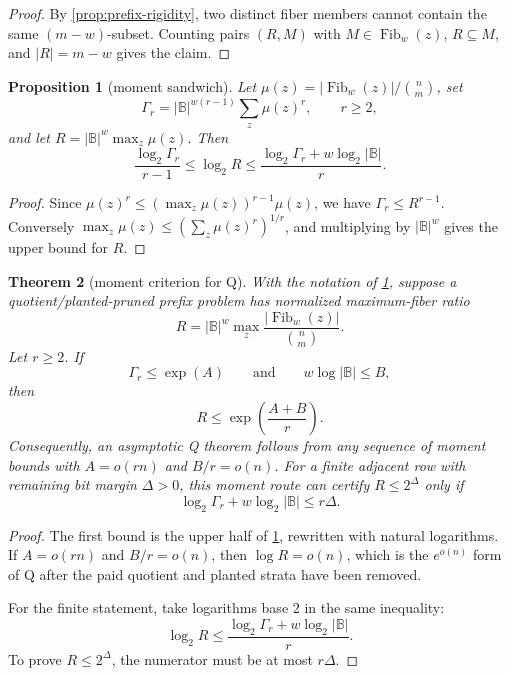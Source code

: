 \documentclass[a4paper,11pt]{amsart}
\newtheorem{theorem}{Theorem}[section]
\newtheorem{proposition}[theorem]{Proposition}
\theoremstyle{remark}
\newcommand{\B}{\mathbb B}
\newcommand{\Fib}{\operatorname{Fib}}
\begin{document}
\begin{proof}
By \cref{prop:prefix-rigidity}, two distinct fiber members cannot contain the same \((m-w)\)-subset.  Counting pairs \((R,M)\) with \(M\in\Fib_w(z)\), \(R\subseteq M\), and \(|R|=m-w\) gives the claim.
\end{proof}

\begin{proposition}[moment sandwich]\label{prop:moment-sandwich}
Let \(\mu(z)=|\Fib_w(z)|/\binom{n}{m}\), set
\[
        \Gamma_r=|\B|^{w(r-1)}\sum_z\mu(z)^r,\qquad r\ge2,
\]
and let \(R=|\B|^w\max_z\mu(z)\).  Then
\[
        \frac{\log_2\Gamma_r}{r-1}\le \log_2 R
        \le \frac{\log_2\Gamma_r+w\log_2|\B|}{r}.
\]
\end{proposition}

\begin{proof}
Since \(\mu(z)^r\le(\max_z\mu(z))^{r-1}\mu(z)\), we have \(\Gamma_r\le R^{r-1}\).  Conversely \(\max_z\mu(z)\le(\sum_z\mu(z)^r)^{1/r}\), and multiplying by \(|\B|^w\) gives the upper bound for \(R\).
\end{proof}

\begin{theorem}[moment criterion for Q]\label{thm:moment-q}
With the notation of \cref{prop:moment-sandwich}, suppose a quotient/planted-pruned prefix problem has normalized maximum-fiber ratio
\[
        R=|\B|^w\max_z\frac{|\Fib_w(z)|}{\binom nm}.
\]
Let \(r\ge2\).  If
\[
        \Gamma_r\le \exp(A)
        \qquad\text{and}\qquad
        w\log|\B|\le B,
\]
then
\[
        R\le \exp\!\left(\frac{A+B}{r}\right).
\]
Consequently, an asymptotic Q theorem follows from any sequence of moment bounds with \(A=o(rn)\) and \(B/r=o(n)\).  For a finite adjacent row with remaining bit margin \(\Delta>0\), this moment route can certify \(R\le2^\Delta\) only if
\[
        \log_2\Gamma_r+w\log_2|\B|\le r\Delta .
\]
\end{theorem}

\begin{proof}
The first bound is the upper half of \cref{prop:moment-sandwich}, rewritten with natural logarithms.  If \(A=o(rn)\) and \(B/r=o(n)\), then \(\log R=o(n)\), which is the \(e^{o(n)}\) form of Q after the paid quotient and planted strata have been removed.

For the finite statement, take logarithms base \(2\) in the same inequality:
\[
        \log_2R\le\frac{\log_2\Gamma_r+w\log_2|\B|}{r}.
\]
To prove \(R\le2^\Delta\), the numerator must be at most \(r\Delta\).
\end{proof}
\end{document}
